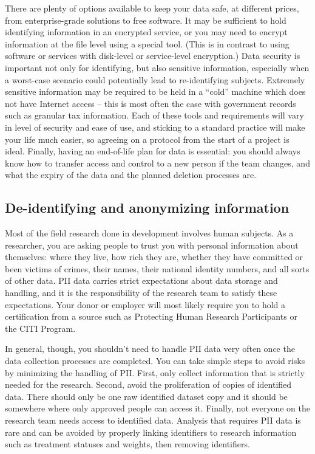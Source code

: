 There are plenty of options available to keep your data safe,
at different prices, from enterprise-grade solutions to free software.
It may be sufficient to hold identifying information in an encrypted service,
or you may need to encrypt information at the file level using a special tool.
(This is in contrast to using software or services with disk-level or service-level encryption.)
Data security is important not only for identifying, but also sensitive information,
especially when a worst-case scenario could potentially lead to re-identifying subjects.
Extremely sensitive information may be required to be held in a ``cold'' machine
which does not have Internet access -- this is most often the case with
government records such as granular tax information.
Each of these tools and requirements will vary in level of security and ease of use,
and sticking to a standard practice will make your life much easier,
so agreeing on a protocol from the start of a project is ideal.
Finally, having an end-of-life plan for data is essential:
you should always know how to transfer access and control to a new person if the team changes,
and what the expiry of the data and the planned deletion processes are.

\subsection{De-identifying and anonymizing information}

Most of the field research done in development involves human subjects.
As a researcher, you are asking people to trust you with personal information about themselves:
where they live, how rich they are, whether they have committed or been victims of crimes,
their names, their national identity numbers, and all sorts of other data.
PII data carries strict expectations about data storage and handling,
and it is the responsibility of the research team to satisfy these expectations.
Your donor or employer will most likely require you to hold a certification from a source
such as Protecting Human Research Participants
or the CITI Program.

In general, though, you shouldn't need to handle PII data very often
once the data collection processes are completed.
You can take simple steps to avoid risks by minimizing the handling of PII.
First, only collect information that is strictly needed for the research.
Second, avoid the proliferation of copies of identified data.
There should only be one raw identified dataset copy
and it should be somewhere where only approved people can access it.
Finally, not everyone on the research team needs access to identified data.
Analysis that requires PII data is rare
and can be avoided by properly linking identifiers to research information
such as treatment statuses and weights, then removing identifiers.


